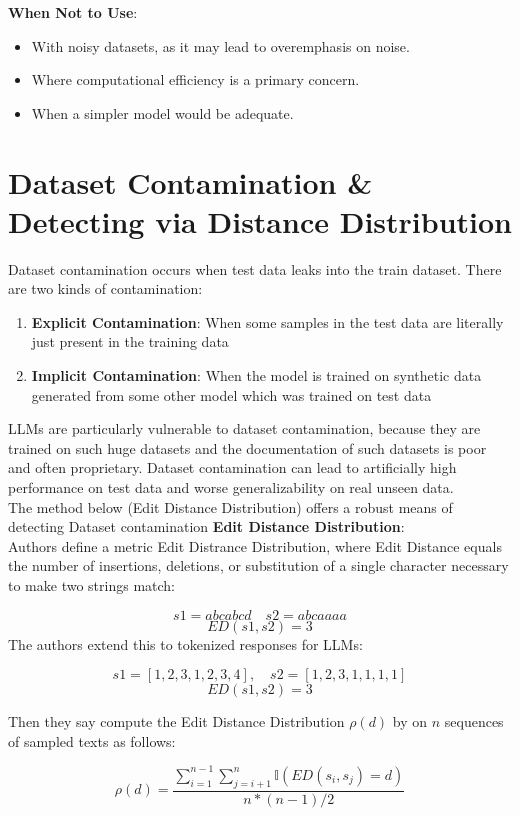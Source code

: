 \documentclass[12pt]{article}
\begin{document}
\textbf{When Not to Use}:
\begin{itemize}
    \item With noisy datasets, as it may lead to overemphasis on noise.
    \item Where computational efficiency is a primary concern.
    \item When a simpler model would be adequate.
\end{itemize}
\section {Dataset Contamination \& Detecting via Distance Distribution}
Dataset contamination occurs when test data leaks into the train dataset. There are two kinds of contamination:

\begin{enumerate}
\item \textbf{Explicit Contamination}: When some samples in the test data are literally just present in the training data
\item \textbf{Implicit Contamination}: When the model is trained on synthetic data generated from some other model which was trained on test data
\end{enumerate}
LLMs are particularly vulnerable to dataset contamination, because they are trained on such huge datasets and the documentation of such datasets is poor and often proprietary. Dataset contamination can lead to artificially high performance on test data and worse generalizability on real unseen data.\\ 

The method below (Edit Distance Distribution) offers a robust means of detecting Dataset contamination
\textbf{Edit Distance Distribution}:\\

Authors define a metric Edit Distrance Distribution, where Edit Distance equals the number of insertions, deletions, or substitution of a single character necessary to make two strings match:

\[s1 = abcabcd\quad s2 = abcaaaa\]
\[ED(s1, s2) = 3\]
The authors extend this to tokenized responses for LLMs: 

\[s1 = [1, 2, 3, 1, 2, 3, 4], \quad s2=[1,2,3,1,1,1,1]\]
\[ED(s1, s2) = 3\]

Then they say compute the Edit Distance Distribution \(\rho(d)\) by on \(n\) sequences of sampled texts as follows:

\[\rho(d) = \frac{\sum_{i=1}^{n-1}\sum_{j=i+1}^{n}\mathbb{I}(ED(s_i, s_j) = d)}{n*(n-1)/2}\]
\end{document}
